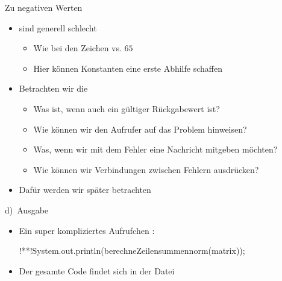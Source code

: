 \iffull
{\AddonFrame
\begin{frame}{Zu negativen Werten}
    \begin{itemize}[<+(1)->]
        \itemsep12pt
        \item {} sind generell schlecht \begin{itemize}
            \item Wie bei den Zeichen  vs. \(65\)
            \item Hier können Konstanten eine erste Abhilfe schaffen
        \end{itemize}
        \item Betrachten wir die  \begin{itemize}
            \item Was ist, wenn  auch ein gültiger Rückgabewert ist?
            \item Wie können wir den Aufrufer auf das Problem hinweisen?
            \item Was, wenn wir mit dem Fehler eine Nachricht mitgeben möchten?
            \item Wie können wir Verbindungen zwischen Fehlern ausdrücken?
        \end{itemize}
        \item Dafür werden wir später  betrachten
    \end{itemize}
\end{frame}
}
\fi

\begin{frame}[fragile]{d)~Ausgabe}
\begin{itemize}[<+(1)->]
    \itemsep8pt
    \item Ein super kompliziertes Aufrufchen :
\begin{plainjava}[aboveskip=0pt]
!**!System.out.println(berechneZeilensummennorm(matrix));
\end{plainjava}
    \item<4-> Der gesamte Code findet sich in der Datei 
\end{itemize}
\end{frame}

